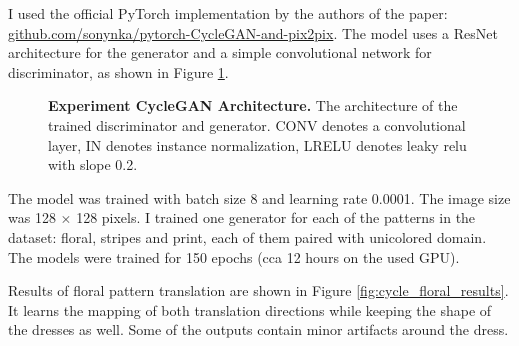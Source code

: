 \documentclass[12pt]{report}
\begin{document}
I used the official PyTorch implementation by the authors of the paper: \linebreak \hyperlink{https://github.com/sonynka/pytorch-CycleGAN-and-pix2pix}{github.com/sonynka/pytorch-CycleGAN-and-pix2pix}. The model uses a ResNet architecture for the generator and a simple convolutional network for discriminator, as shown in Figure \ref{fig:cyclegan_arch}.

\begin{figure}[h]
\centering
{}\vspace{.5cm}
\caption{\label{fig:cyclegan_arch} \textbf{Experiment CycleGAN Architecture.} The architecture of the trained  discriminator and generator. CONV denotes a convolutional layer, IN denotes instance normalization, LRELU denotes leaky relu with slope 0.2.}
\end{figure}

The model was trained with batch size 8 and learning rate 0.0001. The image size was 128 $\times$ 128 pixels. I trained one generator for each of the patterns in the dataset: floral, stripes and print, each of them paired with unicolored domain. The models were trained for 150 epochs (cca 12 hours on the used GPU). 

\pagebreak
Results of floral pattern translation are shown in Figure \ref{fig:cycle_floral_results}. It learns the mapping of both translation directions while keeping the shape of the dresses as well. Some of the outputs contain minor artifacts around the dress.
\end{document}
